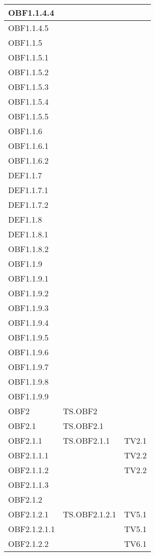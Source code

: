 \documentclass{scalatekids-article}
\begin{document}
\begin{longtable}[H]{|l|p{4cm}|p{4cm}|}
  \hline
  OBF1.1.4.4 &  &\\
  \hline
  OBF1.1.4.5 &  &\\
  \hline
  OBF1.1.5 &  &\\
  \hline
  OBF1.1.5.1 &  &\\
  \hline
  OBF1.1.5.2 &  &\\
  \hline
  OBF1.1.5.3 &  &\\
  \hline
  OBF1.1.5.4 &  &\\
  \hline
  OBF1.1.5.5 &  &\\
  \hline
  OBF1.1.6 & &\\
  \hline
  OBF1.1.6.1 &  &\\
  \hline
  OBF1.1.6.2 &  &\\
  \hline
  DEF1.1.7 & &\\
  \hline
  DEF1.1.7.1 & &\\
  \hline
  DEF1.1.7.2 & &\\
  \hline
  DEF1.1.8 & &\\
  \hline
  DEF1.1.8.1 & &\\
  \hline
  OBF1.1.8.2 &  &\\
  \hline
  OBF1.1.9 &  &\\
  \hline
  OBF1.1.9.1 &  &\\
  \hline
  OBF1.1.9.2 &  &\\
  \hline
  OBF1.1.9.3 &  &\\
  \hline
  OBF1.1.9.4 &  &\\
  \hline
  OBF1.1.9.5 &  &\\
  \hline
  OBF1.1.9.6 &  &\\
  \hline
  OBF1.1.9.7 &  &\\
  \hline
  OBF1.1.9.8 &  &\\
  \hline
  OBF1.1.9.9 &  &\\
  \hline
  OBF2 & TS.OBF2 & \\
  \hline
  OBF2.1 & TS.OBF2.1 &\\
  \hline
  OBF2.1.1 & TS.OBF2.1.1 & TV2.1\\
  \hline
  OBF2.1.1.1 & & TV2.2\\
  \hline
  OBF2.1.1.2 & & TV2.2\\
  \hline
  OBF2.1.1.3 & & \\
  \hline
  OBF2.1.2 & & \\
  \hline
  OBF2.1.2.1 & TS.OBF2.1.2.1 & TV5.1\\
  \hline
  OBF2.1.2.1.1 & & TV5.1\\
  \hline
  OBF2.1.2.2 & & TV6.1\\
  \hline

\end{longtable}
\end{document}
